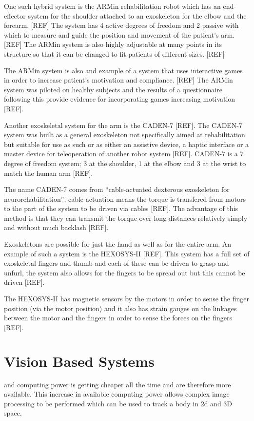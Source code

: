\documentclass[journal]{IEEEtran}
\begin{document}
One such hybrid system is the ARMin rehabilitation robot which has an end-effector system for the 
shoulder attached to an exoskeleton for the elbow and the forearm. [REF] The system has 4 active 
degrees of freedom and 2 passive with which to measure and guide the position and movement of 
the patient's arm. [REF] The ARMin system is also highly adjustable at many points in its structure 
so that it can be changed to fit patients of different sizes. [REF]

The ARMin system is also and example of a system that uses interactive games in order to increase 
patient's motivation and compliance. [REF] The ARMin system was piloted on healthy subjects and 
the results of a questionnaire following this provide evidence for incorporating games increasing 
motivation [REF].

Another exoskeletal system for the arm is the CADEN-7 [REF]. The CADEN-7 system was built as a 
general exoskeleton not specifically aimed at rehabilitation but suitable for use as such or as either an 
assistive device, a haptic interface or a master device for teleoperation of another robot system [REF]. 
CADEN-7 is a 7 degree of freedom system; 3 at the shoulder, 1 at the elbow and 3 at the wrist to 
match the human arm [REF].

The name CADEN-7 comes from ``cable-actuated dexterous exoskeleton for neurorehabilitation'', 
cable actuation means the torque is transfered from motors to the part of the system to be driven 
via cables [REF]. The advantage of this method is that they can transmit the torque over long 
distances relatively simply and without much backlash [REF].

Exoskeletons are possible for just the hand as well as for the entire arm. An example of such a 
system is the HEXOSYS-II [REF]. This system has a full set of exoskeletal fingers and thumb and 
each of these can be driven to grasp and unfurl, the system also allows for the fingers to be 
spread out but this cannot be driven [REF].

The HEXOSYS-II has magnetic sensors by the motors in order to sense the finger position (via 
the motor position) and it also has strain gauges on the linkages between the motor and the fingers 
in order to sense the forces on the fingers [REF].

\section{Vision Based Systems}
 and computing power is getting cheaper all the time and are therefore 
more available. This increase in available computing power allows complex image processing to be performed 
which can be used to track a body in 2d and 3D space.
\end{document}
